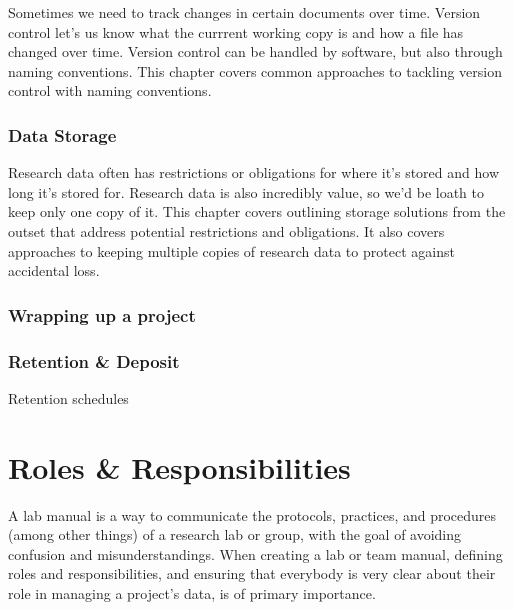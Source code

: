 \documentclass[
]{book}
\begin{document}
Sometimes we need to track changes in certain documents over time. Version control let's us know what the currrent working copy is and how a file has changed over time. Version control can be handled by software, but also through naming conventions. This chapter covers common approaches to tackling version control with naming conventions.

\hypertarget{data-storage}{%
\subsection*{Data Storage}\label{data-storage}}

Research data often has restrictions or obligations for where it's stored and how long it's stored for. Research data is also incredibly value, so we'd be loath to keep only one copy of it. This chapter covers outlining storage solutions from the outset that address potential restrictions and obligations. It also covers approaches to keeping multiple copies of research data to protect against accidental loss.

\hypertarget{wrapping-up-a-project}{%
\subsection*{Wrapping up a project}\label{wrapping-up-a-project}}

\hypertarget{retention-deposit}{%
\subsection*{Retention \& Deposit}\label{retention-deposit}}

Retention schedules

\hypertarget{roles-responsibilities-1}{%
\chapter*{Roles \& Responsibilities}\label{roles-responsibilities-1}}

A lab manual is a way to communicate the protocols, practices, and procedures (among other things) of a research lab or group, with the goal of avoiding confusion and misunderstandings. When creating a lab or team manual, defining roles and responsibilities, and ensuring that everybody is very clear about their role in managing a project's data, is of primary importance.
\end{document}
